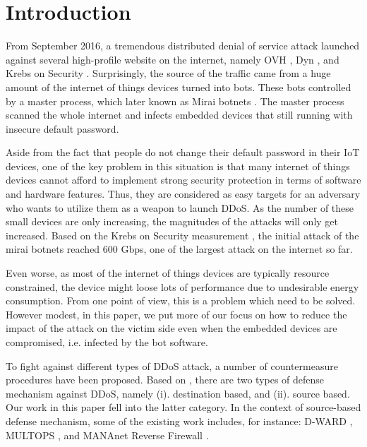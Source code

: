 \documentclass[sigplan,screen]{acmart}
\begin{document}
\maketitle

\section{Introduction}
From September 2016, a tremendous distributed denial of service attack launched against several high-profile website on the internet, namely OVH \cite{ovh}, Dyn \cite{dyn}, and Krebs on Security \cite{kos}. Surprisingly, the source of the traffic came from a huge amount of the internet of things devices turned into bots. These bots controlled by a master process, which later known as Mirai botnets \cite{203628}. The master process scanned the whole internet and infects embedded devices that still running with insecure default password. 

Aside from the fact that people do not change their default password in their IoT devices, one of the key problem in this situation is that many internet of things devices cannot afford to implement strong security protection in terms of software and hardware features. Thus, they are considered as easy targets for an adversary who wants to utilize them as a weapon to launch DDoS. As the number of these small devices are only increasing, the magnitudes of the attacks will only get increased. Based on the Krebs on Security measurement \cite{kos}, the initial attack of the mirai botnets reached 600 Gbps, one of the largest attack on the internet so far.

Even worse, as most of the internet of things devices are typically resource constrained, the device might loose lots of performance due to undesirable energy consumption. From one point of view, this is a problem which need to be solved. However modest, in this paper, we put more of our focus on how to reduce the impact of the attack on the victim side even when the embedded devices are compromised, i.e. infected by the bot software. 

To fight against different types of DDoS attack, a number of countermeasure procedures have been proposed. Based on \cite{6489876}, there are two types of defense mechanism against DDoS, namely (i). destination based, and (ii). source based. Our work in this paper fell into the latter category. In the context of source-based defense mechanism, some of the existing work includes, for instance: D-WARD \cite{1510618}, MULTOPS \cite{10.5555/1251327.1251330}, and MANAnet Reverse Firewall \cite{mananet}.
\end{document}
